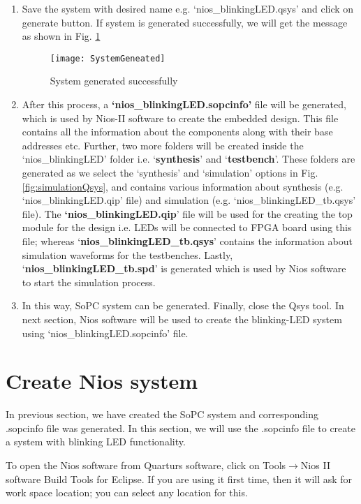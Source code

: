 \begin{enumerate}
	
	\item Save the system with desired name e.g. `nios\_blinkingLED.qsys' and click on generate button. If system is generated successfully, we will get the message as shown in Fig. \ref{fig:SystemGeneated}
	\begin{figure}[!h]
		\centering
		\texttt{[image: SystemGeneated]}
		\caption{System generated successfully}
		\label{fig:SystemGeneated}
	\end{figure}	
	
	\item After this process, a \textbf{`nios\_blinkingLED.sopcinfo'} file will be generated, which is used by Nios-II software to create the embedded design. This file contains all the information about the components along with their base addresses etc. Further, two more folders will be created inside the `nios\_blinkingLED' folder i.e. `\textbf{synthesis}' and `\textbf{testbench}'. These folders are generated as we select the `synthesis' and `simulation' options in Fig. \ref{fig:simulationQsys}, and contains various information about synthesis (e.g. `nios\_blinkingLED.qip' file) and simulation (e.g. `nios\_blinkingLED\_tb.qsys' file). The \textbf{`nios\_blinkingLED.qip}' file will be used for the creating the top module for the design i.e. LEDs will be connected to FPGA board using this file; whereas `\textbf{nios\_blinkingLED\_tb.qsys}' contains the information about simulation waveforms for the testbenches. Lastly, `\textbf{nios\_blinkingLED\_tb.spd}' is generated which is used by Nios software to start the simulation process. 
	
	\item In this way, SoPC system can be generated. Finally, close the Qsys tool. 	In next section, Nios software will be used to create the blinking-LED system using `nios\_blinkingLED.sopcinfo' file.
\end{enumerate}

\section{Create Nios system} \label{sec:Nios_create_sys}
In previous section, we have created the SoPC system and corresponding .sopcinfo file was generated. In this section, we will use the .sopcinfo file to create a system with blinking LED functionality. 

To open the Nios software from Quarturs software, click on Tools$\rightarrow$Nios II software Build Tools for Eclipse. If you are using it first time, then it will ask for work space location; you can select any location for this.  

